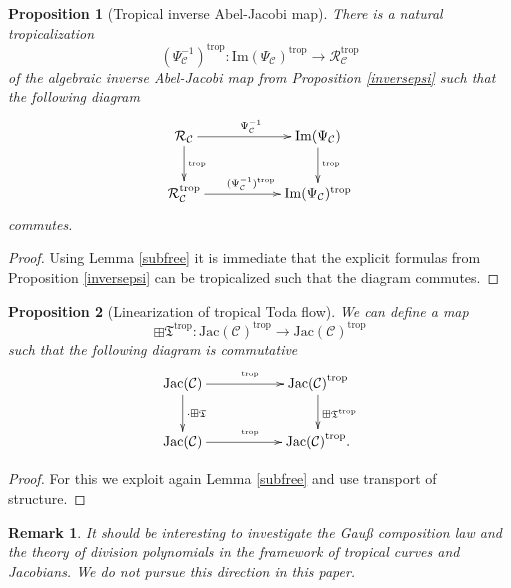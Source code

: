 \documentclass[11pt, a4paper]{amsart}
\newcommand{\jac}{\mathrm{Jac(\mathcal C)}}
\newcommand{\eqst}[1]{\begin{equation*}#1\end{equation*}}
\theoremstyle{plain}
\newtheorem{proposition}{Proposition}[section]
\newtheorem{remark}{Remark}[section]
\numberwithin{equation}{section}
\begin{document}
\begin{proposition}[Tropical inverse Abel-Jacobi map]
There is a natural tropicalization \eqst{(\Psi^{-1}_\mathcal C)^{\mathrm{trop}} : \mathrm{Im}(\Psi_\mathcal C)^{\mathrm{trop}} \longrightarrow \mathcal R_\mathcal C ^{\mathrm{trop}}} of the algebraic inverse Abel-Jacobi map from Proposition \ref{inversepsi} such that the following diagram 
\eqst{\xymatrix{ \mathcal R _\mathcal C \ar[rr]^{\Psi_\mathcal C^{-1}}  \ar[d]^{{}^\mathrm{trop}} && \mathrm{Im}(\Psi_\mathcal C) \ar[d]^{{}^\mathrm{trop}} \\  \mathcal R _\mathcal C ^{\mathrm{trop}} \ar[rr]^{(\Psi^{-1}_{\mathcal C})^{\mathrm{trop}} }&&  \mathrm{Im}(\Psi_\mathcal C) ^{\mathrm{trop}} }}
commutes.
\end{proposition}
\begin{proof}
Using Lemma \ref{subfree} it is immediate that the explicit formulas from Proposition \ref{inversepsi} can be tropicalized such that the diagram commutes.
\end{proof}
\begin{proposition}[Linearization of tropical Toda flow]
We can define a map \eqst{\boxplus \mathfrak T ^{\mathrm{trop}} : \jac^{\mathrm{trop}} \longrightarrow \jac ^{\mathrm{trop}}} such that the following diagram is commutative
\eqst{\xymatrix{ \jac \ar[d]^{\cdot \boxplus \mathfrak T} \ar[rr]^{{}^{\mathrm{trop}}} && \jac^{\mathrm{trop}} \ar[d]^{\boxplus \mathfrak T ^{\mathrm{trop}}}\\  \jac \ar[rr]^{{}^{\mathrm{trop}}} &&\jac^{\mathrm{trop}}.} }
\end{proposition}
\begin{proof}
For this we exploit again Lemma \ref{subfree} and use transport of structure.
\end{proof}
\begin{remark}
It should be interesting to investigate the Gauß composition law and the theory of division polynomials in the framework of tropical curves and Jacobians. We do not pursue this direction in this paper.
\end{remark}





\end{document}
